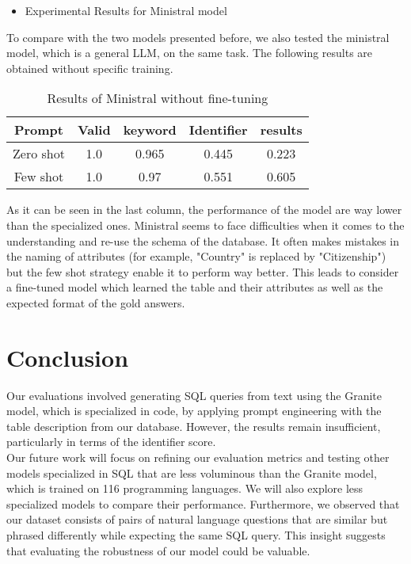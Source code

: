 \documentclass[12pt,a4paper]{article}
\begin{document}
\begin{itemize}
\item Experimental Results for Ministral model
\end{itemize}

To compare with the two models presented before, we also tested the ministral model, which is a general LLM, on the same task. The following results are obtained without specific training.

\begin{table}[h]
    \centering
    \begin{tabular}{|c|c|c|c|c|}
        \hline
         \textbf{Prompt}& \textbf{Valid} & \textbf{keyword}&\textbf{Identifier}& \textbf{results}\\
         \hline
         Zero shot& 1.0&0.965&0.445&0.223 \\
         Few shot& 1.0&0.97&0.551&0.605\\
         \hline
    \end{tabular}
    \caption{Results of Ministral without fine-tuning}
    \label{tab:my_label}
\end{table}
As it can be seen in the last column, the performance of the model are way lower than the specialized ones. Ministral seems to face difficulties when it comes to the understanding and re-use the schema of the database. It often makes mistakes in the naming of attributes (for example, "Country" is replaced by "Citizenship") but the few shot strategy enable it to perform way better. This leads to consider a fine-tuned model which learned the table and their attributes as well as the expected format of the gold answers. 
\section*{Conclusion}

Our evaluations involved generating SQL queries from text using the Granite model, which is specialized in code, by applying prompt engineering with the table description from our database. However, the results remain insufficient, particularly in terms of the identifier score.\\

Our future work will focus on refining our evaluation metrics and testing other models specialized in SQL that are less voluminous than the Granite model, which is trained on 116 programming languages. We will also explore less specialized models to compare their performance.
Furthermore, we observed that our dataset consists of pairs of natural language questions that are similar but phrased differently while expecting the same SQL query. This insight suggests that evaluating the robustness of our model could be valuable.\\
\end{document}
